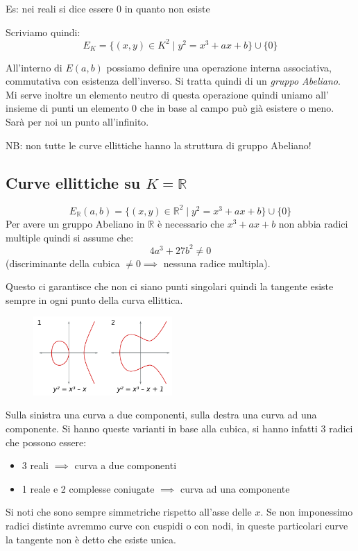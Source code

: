 Es: nei reali si dice essere 0 in quanto non esiste

Scriviamo quindi:
$$ E_K = \{ (x,y) \in K^2 \mid y^2 = x^3 + ax +b \} \cup \{0\} $$

All'interno di $E(a,b)$ possiamo definire una operazione interna associativa, commutativa con esistenza dell'inverso.
Si tratta quindi di un \emph{gruppo Abeliano}.
Mi serve inoltre un elemento neutro di questa operazione quindi uniamo all' insieme di punti un elemento 0 che in base al campo può già esistere o meno.
Sarà per noi un punto all'infinito.

NB: non tutte le curve ellittiche hanno la struttura di gruppo Abeliano!

\subsection{Curve ellittiche su $K=\mathbb{R}$}
$$ E_{\mathbb{R}}(a,b) = \{(x,y) \in \mathbb{R}^2 \mid y^2 = x^3 + ax +b \} \cup \{0\} $$
Per avere un gruppo Abeliano in $\mathbb{R}$ è necessario che $x^3 + ax + b$ non abbia radici multiple quindi si assume che:
$$ 4a^3 + 27b^2 \neq 0 $$
(discriminante della cubica $\neq 0 \implies $ nessuna radice multipla).

Questo ci garantisce che non ci siano punti singolari quindi la tangente esiste sempre in ogni punto della curva ellittica.

\begin{figure}[H]
    \centering
    \includegraphics[width=200px]{ECC_1.png}
\end{figure}

Sulla sinistra una curva a due componenti, sulla destra una curva ad una componente.
Si hanno queste varianti in base alla cubica, si hanno infatti 3 radici che possono essere:
\begin{itemize}
    \item 3 reali $\implies$ curva a due componenti
    \item 1 reale e 2 complesse coniugate $\implies$ curva ad una componente
\end{itemize}

Si noti che sono sempre simmetriche rispetto all'asse delle $x$.
Se non imponessimo radici distinte avremmo curve con cuspidi o con nodi, in queste particolari curve la tangente non è detto che esiste unica.

